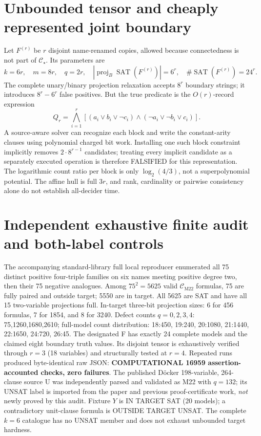 \documentclass[11pt]{article}
\newcommand{\CM}{\mathcal C_{\mathrm{M22}}}
\newcommand{\CS}{\mathcal C_\star}
\begin{document}
\section{Unbounded tensor and cheaply represented joint boundary}
Let $F^{(r)}$ be $r$ disjoint name-renamed copies, allowed because connectedness is not part of $\CS$. Its parameters are
\[
 k=6r,\quad m=8r,\quad q=2r,\quad
 |\operatorname{proj}_B\operatorname{SAT}(F^{(r)})|=6^r,\quad
 \#\operatorname{SAT}(F^{(r)})=24^r.
\]
The complete unary/binary projection relaxation accepts $8^r$ boundary strings; it introduces $8^r-6^r$ false positives. But the true predicate is the $O(r)$-record expression
\[
 Q_r=\bigwedge_{i=1}^r[(a_i\lor b_i\lor\neg c_i)\land
                       (\neg a_i\lor\neg b_i\lor c_i)].
\]
A source-aware solver can recognize each block and write the constant-arity clauses using polynomial charged bit work. Installing one such block constraint implicitly removes $2\cdot8^{r-1}$ candidates; treating every implicit candidate as a separately executed operation is therefore FALSIFIED for this representation. The logarithmic count ratio per block is only $\log_2(4/3)$, not a superpolynomial potential. The affine hull is full $3r$, and rank, cardinality or pairwise consistency alone do not establish all-decider time.

\section{Independent exhaustive finite audit and both-label controls}
The accompanying standard-library full local reproducer enumerated all 75 distinct positive four-triple families on six names meeting positive degree two, then their 75 negative analogues. Among $75^2=5625$ valid $\CM$ formulas, 75 are fully paired and outside target; 5550 are in target. All 5625 are SAT and have all 15 two-variable projections full. In-target three-bit projection sizes: 6 for 456 formulas, 7 for 1854, and 8 for 3240. Defect counts $q=0,2,3,4$: 75,1260,1680,2610; full-model count distribution: 18:450, 19:240, 20:1080, 21:1440, 22:1650, 24:720, 26:45. The designated F has exactly 24 complete models and the claimed eight boundary truth values. Its disjoint tensor is exhaustively verified through $r=3$ (18 variables) and structurally tested at $r=4$. Repeated runs produced byte-identical raw JSON: \textbf{COMPUTATIONAL 16959 assertion-accounted checks, zero failures}. The published D\"ocker 198-variable, 264-clause source U was independently parsed and validated as M22 with $q=132$; its UNSAT label is imported from the paper and previous proof-certificate work, \emph{not} newly proved by this audit. Fixture $Y$ is IN TARGET SAT (20 models); a contradictory unit-clause formula is OUTSIDE TARGET UNSAT. The complete $k=6$ catalogue has no UNSAT member and does not exhaust unbounded target hardness.
\end{document}
